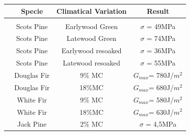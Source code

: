 \begin{table}[]
	\centering
	\begin{tabular}{cccc}
		\hline
		\rowcolor[HTML]{BFBFBF} 
		\multicolumn{1}{|c|}{\cellcolor[HTML]{BFBFBF}Reference} & \multicolumn{1}{c|}{\cellcolor[HTML]{BFBFBF}Specie} & \multicolumn{1}{c|}{\cellcolor[HTML]{BFBFBF}Climatical   Variation} & \multicolumn{1}{c|}{\cellcolor[HTML]{BFBFBF}Result} \\ \hline
		\multicolumn{1}{l}{} & \multicolumn{1}{l}{} & \multicolumn{1}{l}{} & \multicolumn{1}{l}{} \\ \hline
		\multicolumn{1}{|c|}{\cellcolor[HTML]{FFE699}\cite{Kif1998}} & \multicolumn{1}{c|}{Scots Pine} & \multicolumn{1}{c|}{Earlywood Green} & \multicolumn{1}{c|}{$\sigma$ = 49MPa} \\ \hline
		\multicolumn{1}{|c|}{\cellcolor[HTML]{FFE699}\cite{Kif1998}} & \multicolumn{1}{c|}{Scots Pine} & \multicolumn{1}{c|}{Latewood Green} & \multicolumn{1}{c|}{$\sigma$ = 74MPa} \\ \hline
		\multicolumn{1}{|c|}{\cellcolor[HTML]{FFE699}\cite{Kif1998}} & \multicolumn{1}{c|}{Scots Pine} & \multicolumn{1}{c|}{Earlywood resoaked} & \multicolumn{1}{c|}{$\sigma$ = 36MPa} \\ \hline
		\multicolumn{1}{|c|}{\cellcolor[HTML]{FFE699}\cite{Kif1998}} & \multicolumn{1}{c|}{Scots Pine} & \multicolumn{1}{c|}{Latewood resoaked} & \multicolumn{1}{c|}{$\sigma$ = 55MPa} \\ \hline
		\multicolumn{1}{|c|}{\cellcolor[HTML]{B4C6E7}\parencite{ref:Ang2017}} & \multicolumn{1}{c|}{Douglas Fir} & \multicolumn{1}{c|}{9\% MC} & \multicolumn{1}{c|}{$G_{max}$= 780J/$m^{2}$} \\ \hline
		\multicolumn{1}{|c|}{\cellcolor[HTML]{B4C6E7}\cite{Ang2017}} & \multicolumn{1}{c|}{Douglas Fir} & \multicolumn{1}{c|}{18\%MC} & \multicolumn{1}{c|}{$G_{max}$= 680J/$m^{2}$} \\ \hline
		\multicolumn{1}{|c|}{\cellcolor[HTML]{B4C6E7}\cite{Ang2017}} & \multicolumn{1}{c|}{White Fir} & \multicolumn{1}{c|}{9\% MC} & \multicolumn{1}{c|}{$G_{max}$= 580J/$m^{2}$} \\ \hline
		\multicolumn{1}{|c|}{\cellcolor[HTML]{B4C6E7}\cite{Ang2017}} & \multicolumn{1}{c|}{White Fir} & \multicolumn{1}{c|}{18\%MC} & \multicolumn{1}{c|}{$G_{max}$= 630J/$m^{2}$} \\ \hline
		\multicolumn{1}{|c|}{\cellcolor[HTML]{C6E0B4}\cite{Huang2020}} & \multicolumn{1}{c|}{Jack Pine} & \multicolumn{1}{c|}{2\% MC} & \multicolumn{1}{c|}{$\sigma$ = 4,5MPa} \\ \hline

\end{tabular}
\end{table}
